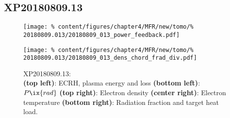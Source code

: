         \subsection*{XP20180809.13}%
%
            \begin{figure}[t]%
                \centering%
                \captionsetup{width=.47\textwidth}%
                \begin{minipage}[c]{0.47\textwidth}%
                    \centering%
                    \texttt{[image: \%
                        content/figures/chapter4/MFR/new/tomo/\%
                        20180809.013/20180809\_013\_power\_feedback.pdf]}%
                    \caption{%
                        XP20180809.13:\\%
                        \textbf{(top left)}: ECRH, plasma energy and loss \textbf{(bottom left)}: $P\ix{rad}$ \textbf{(top right)}: Electron density \textbf{(center right)}: Electron temperature \textbf{(bottom right)}: Radiation fraction and target heat load.}\label{fig:20180809.13_PDF}%
                \end{minipage}%
                \hfill%
                \begin{minipage}[c]{0.47\textwidth}%
                    \centering%
                    \texttt{[image: \%
                        content/figures/chapter4/MFR/new/tomo/\%
                        20180809.013/20180809\_013\_dens\_chord\_frad\_div.pdf]}%
                \end{minipage}%
            \end{figure}%
%
